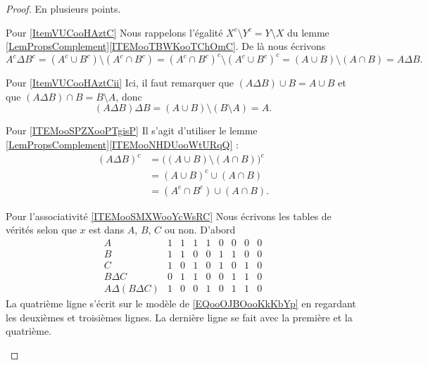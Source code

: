 \begin{proof}
    En plusieurs points.
    \begin{subproof}
    \item[Pour \ref{ItemVUCooHAztC}]
    Nous rappelons l'égalité \( X^c\setminus Y^c=Y\setminus X\) du lemme \ref{LemPropsComplement}\ref{ITEMooTBWKooTChOmC}. De là nous écrivons
    \begin{equation}
        A^c\Delta B^c=(A^c\cup B^c)\setminus(A^c\cap B^c)=(A^c\cap B^c)^c\setminus(A^c\cup B^c)^c=(A\cup B)\setminus (A\cap B)=A\Delta B.
    \end{equation}
\item[Pour \ref{ItemVUCooHAztCii}]
    Ici, il faut remarquer que \( (A\Delta B)\cup B=A\cup B\) et que \( (A\Delta B)\cap B=B\setminus A\), donc
    \begin{equation}
        (A\Delta B)\Delta B=(A\cup B)\setminus (B\setminus A)=A.
    \end{equation}

\item[Pour \ref{ITEMooSPZXooPTgisP}]
    Il s'agit d'utiliser le lemme \ref{LemPropsComplement}\ref{ITEMooNHDUooWtURqQ} :
    \begin{subequations}
        \begin{align}
            (A\Delta B)^c&=\Big( (A\cup B)\setminus (A\cap B) \Big)^c\\
            &=(A\cup B)^c\cup(A\cap B)\\
            &=(A^c\cap B^c)\cup(A\cap B).
        \end{align}
    \end{subequations}
\item[Pour l'associativité \ref{ITEMooSMXWooYcWsRC}]
           Nous écrivons les tables de vérités selon que \( x\) est dans \( A\), \( B\), \( C\) ou non. D'abord
           \begin{equation}
               \begin{array}{|c|c|c|c|c|c|c|c|c|}
                   A&1&1&1&1&0&0&0&0\\
                   B&1&1&0&0&1&1&0&0\\
                   C&1&0&1&0&1&0&1&0\\
                   \hline%
           B\Delta C&0&1&1&0&0&1&1&0\\
           \hline%
A\Delta (B\Delta C) &1&0&0&1&0&1&1&0     
               \end{array}
           \end{equation}
           La quatrième ligne s'écrit sur le modèle de \eqref{EQooOJBOooKkKbYp} en regardant les deuxièmes et troisièmes lignes. La dernière ligne se fait avec la première et la quatrième.


\end{subproof}
\end{proof}
